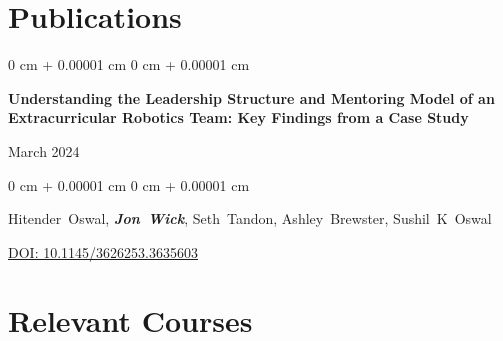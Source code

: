 \documentclass[10pt, article]{article}
\newenvironment{onecolentry}{
    \begin{adjustwidth}{
        0 cm + 0.00001 cm
    }{
        0 cm + 0.00001 cm
    }
}{
    \end{adjustwidth}
} %
\newenvironment{twocolentry}[2][]{
    \onecolentry
    \def\secondColumn{#2}
    \setcolumnwidth{\fill, 4.5 cm}
    \begin{paracol}{2}
}{
    \switchcolumn \raggedleft \secondColumn
    \end{paracol}
    \endonecolentry
} %
\begin{document}
    \section{Publications}




        \begin{samepage}
            \begin{twocolentry}{
                March 2024
            }
                \textbf{Understanding the Leadership Structure and Mentoring Model of an Extracurricular Robotics Team: Key Findings from a Case Study}
            \end{twocolentry}

            \vspace{0.10 cm}

            \begin{onecolentry}
              \mbox{Hitender Oswal}, \mbox{\textbf{\textit{Jon Wick}}}, \mbox{Seth Tandon}, \mbox{Ashley Brewster}, \mbox{Sushil K Oswal}

                \vspace{0.10 cm}

        \href{https://doi.org/10.1145/3626253.3635603}{DOI: 10.1145/3626253.3635603}
        \end{onecolentry}
        \end{samepage}


    \section{Relevant Courses}
\end{document}

